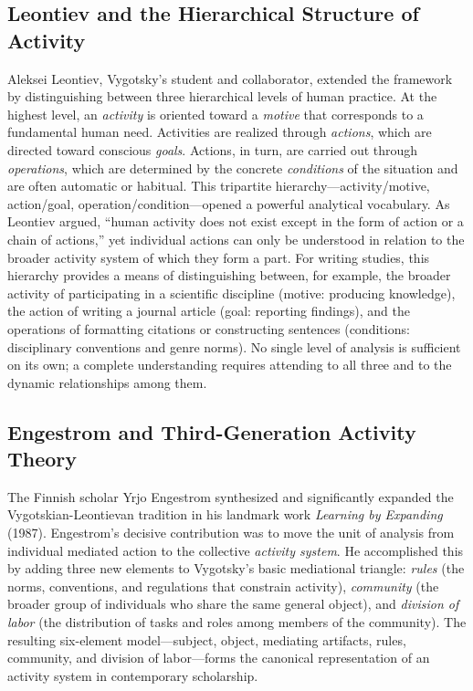 \documentclass[12pt]{article}
\begin{document}
\subsection{Leontiev and the Hierarchical Structure of Activity}

Aleksei Leontiev, Vygotsky's student and collaborator, extended the framework by distinguishing between three hierarchical levels of human practice. At the highest level, an \textit{activity} is oriented toward a \textit{motive} that corresponds to a fundamental human need. Activities are realized through \textit{actions}, which are directed toward conscious \textit{goals}. Actions, in turn, are carried out through \textit{operations}, which are determined by the concrete \textit{conditions} of the situation and are often automatic or habitual. This tripartite hierarchy---activity/motive, action/goal, operation/condition---opened a powerful analytical vocabulary. As Leontiev argued, ``human activity does not exist except in the form of action or a chain of actions,'' yet individual actions can only be understood in relation to the broader activity system of which they form a part. For writing studies, this hierarchy provides a means of distinguishing between, for example, the broader activity of participating in a scientific discipline (motive: producing knowledge), the action of writing a journal article (goal: reporting findings), and the operations of formatting citations or constructing sentences (conditions: disciplinary conventions and genre norms). No single level of analysis is sufficient on its own; a complete understanding requires attending to all three and to the dynamic relationships among them.

\subsection{Engestrom and Third-Generation Activity Theory}

The Finnish scholar Yrjo Engestrom synthesized and significantly expanded the Vygotskian-Leontievan tradition in his landmark work \textit{Learning by Expanding} (1987). Engestrom's decisive contribution was to move the unit of analysis from individual mediated action to the collective \textit{activity system}. He accomplished this by adding three new elements to Vygotsky's basic mediational triangle: \textit{rules} (the norms, conventions, and regulations that constrain activity), \textit{community} (the broader group of individuals who share the same general object), and \textit{division of labor} (the distribution of tasks and roles among members of the community). The resulting six-element model---subject, object, mediating artifacts, rules, community, and division of labor---forms the canonical representation of an activity system in contemporary scholarship.
\end{document}
